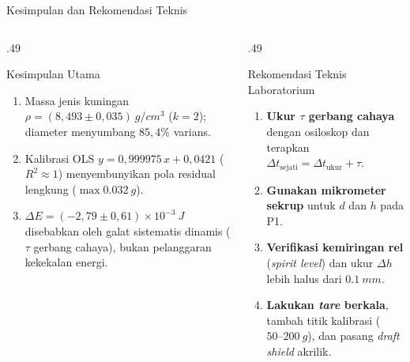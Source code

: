 \documentclass[aspectratio=169,10pt]{beamer}
\newcommand{\sm}{\fontsize{8.2}{10.2}\selectfont}
\begin{document}
\begin{frame}{Kesimpulan dan Rekomendasi Teknis}
\begin{columns}[T,onlytextwidth]
\begin{column}{.49\textwidth}
\begin{block}{Kesimpulan Utama}\sm
\begin{enumerate}
\item Massa jenis kuningan $\rho = (8{,}493 \pm 0{,}035)\ \si{g/cm^3}$ ($k=2$); diameter menyumbang $85{,}4\%$ varians.
\item Kalibrasi OLS $y = 0{,}999975\,x + 0{,}0421$ ($R^2 \approx 1$) menyembunyikan pola residual lengkung ($\max \SI{0,032}{g}$).
\item $\Delta E = (-2{,}79 \pm 0{,}61)\times 10^{-3}\ \si{J}$ disebabkan oleh galat sistematis dinamis ($\tau$ gerbang cahaya), bukan pelanggaran kekekalan energi.
\end{enumerate}
\end{block}
\end{column}

\begin{column}{.49\textwidth}
\begin{exampleblock}{Rekomendasi Teknis Laboratorium}\sm
\begin{enumerate}
\item \textbf{Ukur $\tau$ gerbang cahaya} dengan osiloskop dan terapkan $\Delta t_{\mathrm{sejati}} = \Delta t_{\mathrm{ukur}} + \tau$.
\item \textbf{Gunakan mikrometer sekrup} untuk $d$ dan $h$ pada P1.
\item \textbf{Verifikasi kemiringan rel} (\textit{spirit level}) dan ukur $\Delta h$ lebih halus dari $\SI{0,1}{mm}$.
\item \textbf{Lakukan \textit{tare} berkala}, tambah titik kalibrasi ($50\text{--}200\ \si{g}$), dan pasang \textit{draft shield} akrilik.
\end{enumerate}
\end{exampleblock}
\end{column}
\end{columns}
\end{frame}
\end{document}
